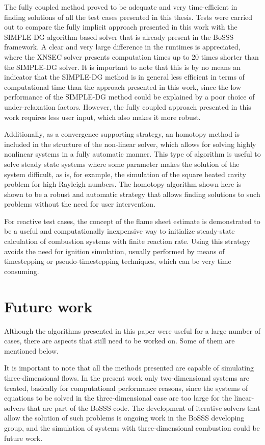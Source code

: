 The fully coupled method proved to be adequate and very time-efficient in finding solutions of all the test cases presented in this thesis. Tests were carried out to compare the fully implicit approach presented in this work with the SIMPLE-DG algorithm-based solver that is already present in the BoSSS framework. A clear and very large difference in the runtimes is appreciated, where the XNSEC solver presents computation times up to 20 times shorter than the SIMPLE-DG solver. It is important to note that this is by no means an indicator that the SIMPLE-DG method is in general less efficient in terms of computational time than the approach presented in this work, since the low performance of the SIMPLE-DG method could be explained by a poor choice of under-relaxation factors. However, the fully coupled approach presented in this work requires less user input, which also makes it more robust.

Additionally, as a convergence supporting strategy, an homotopy method is included in the structure of the non-linear solver, which allows for solving highly nonlinear systems in a fully automatic manner. This type of algorithm is useful to solve steady state systems where some parameter makes the solution of the system difficult, as is, for example, the simulation of the square heated cavity problem for high Rayleigh numbers. The homotopy algorithm shown here is shown to be a robust and automatic strategy that allows finding solutions to such problems without the need for user intervention.

For reactive test cases, the concept of the flame sheet estimate is demonstrated to be a useful and computationally inexpensive way to initialize steady-state calculation of combustion systems with finite reaction rate. Using this strategy avoids the need for ignition simulation, usually performed by means of timestepping or pseudo-timestepping techniques, which can be very time consuming.






\section{Future work}

Although the algorithms presented in this paper were useful for a large number of cases, there are aspects that still need to be worked on. Some of them are mentioned below.

It is important to note that all the methods presented are capable of simulating three-dimensional flows. In the present work only two-dimensional systems are treated, basically for computational performance reasons, since the systems of equations to be solved in the three-dimensional case are too large for the linear-solvers that are part of the BoSSS-code. The development of iterative solvers that allow the solution of such problems is ongoing work in the BoSSS developing group, and the simulation of systems with three-dimensional combustion could be future work.

